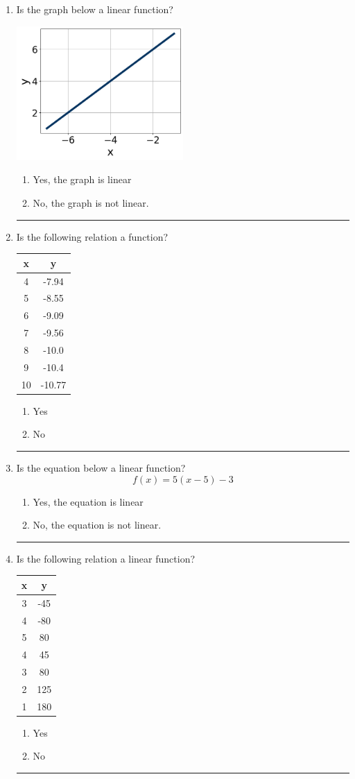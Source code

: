 \documentclass[14pt]{extbook}
\newcommand{\litem}[1]{\item#1\hspace*{-1cm}\rule{\textwidth}{0.4pt}}
\begin{document}
\begin{enumerate}
{\begin{enumerate}[label=\Alph*.]
\end{enumerate} }
\litem{
Is the graph below a linear function?
\begin{center}
    \includegraphics[width=0.5\textwidth]{../Figures/MA_8_F_1_2_graphV.png}
\end{center}
\begin{enumerate}[label=\Alph*.]
\item Yes, the graph is linear
\item No, the graph is not linear.

\end{enumerate} }
\litem{
Is the following relation a function?

\begin{tabular}{c|c}
x &y\tabularnewline \hline
4 &-7.94\tabularnewline \hline
5 &-8.55\tabularnewline \hline
6 &-9.09\tabularnewline \hline
7 &-9.56\tabularnewline \hline
8 &-10.0\tabularnewline \hline
9 &-10.4\tabularnewline \hline
10 &-10.77\end{tabular}\begin{enumerate}[label=\Alph*.]
\item Yes
\item No

\end{enumerate} }
\litem{
Is the equation below a linear function?\[ f(x) = 5(x -5)-3 \]\begin{enumerate}[label=\Alph*.]
\item Yes, the equation is linear
\item No, the equation is not linear.

\end{enumerate} }
\litem{
Is the following relation a linear function?

\begin{tabular}{c|c}
x &y\tabularnewline \hline
3 &-45\tabularnewline \hline
4 &-80\tabularnewline \hline
5 &80\tabularnewline \hline
4 &45\tabularnewline \hline
3 &80\tabularnewline \hline
2 &125\tabularnewline \hline
1 &180\end{tabular}\begin{enumerate}[label=\Alph*.]
\item Yes
\item No


\end{enumerate}}
\end{enumerate}
\end{document}
